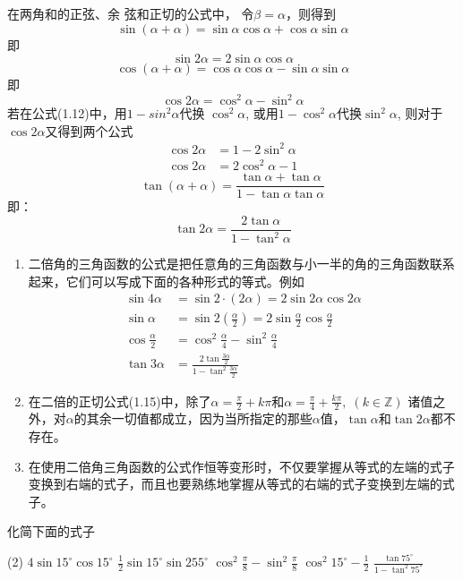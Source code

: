 在两角和的正弦、余
弦和正切的公式中，
令$\beta=\alpha$，则得到
\[\sin(\alpha+\alpha)=\sin\alpha\cos\alpha+\cos\alpha\sin\alpha\]
即
\begin{equation}
    \sin2\alpha=2\sin\alpha\cos\alpha
\end{equation}
\[\cos(\alpha+\alpha)=\cos\alpha\cos\alpha-\sin\alpha\sin\alpha\]
即
\begin{equation}
    \cos2\alpha=\cos^2\alpha-\sin^2\alpha
\end{equation}
若在公式(1.12)中，用$1-sin^2\alpha$代换 $\cos^2\alpha$, 或用$1-\cos^2\alpha$代换$\sin^2\alpha$, 则对于$\cos2\alpha$又得到两个公式
\begin{align}
    \cos2\alpha&=1-2\sin^2\alpha\\
    \cos2\alpha&=2\cos^2\alpha-1 
\end{align}
\[\tan (\alpha+\alpha)=\frac{\tan\alpha+\tan\alpha}{1-\tan\alpha\tan\alpha}\]
即：
\begin{equation}
    \tan2\alpha=\frac{2\tan\alpha}{1-\tan^2\alpha}
\end{equation}

\begin{rmk}
\begin{enumerate}
    \item 二倍角的三角函数的公式是把任意角的三角函数与小一半的角的三角函数联系起来，它们可以写成下面的各种形式的等式。例如
\[\begin{split}
    \sin4\alpha&=\sin2\cdot (2\alpha) =2\sin2\alpha\cos2\alpha\\
    \sin\alpha&=\sin2\left(\frac{\alpha}{2}\right)=2\sin\frac{\alpha}{2}\cos \frac{\alpha}{2}\\
    \cos\frac{\alpha}{2}&=\cos^2\frac{\alpha}{4}-\sin^2\frac{\alpha}{4}\\
    \tan3\alpha&=\frac{2\tan\frac{3\alpha}{2}}{1-\tan^2\frac{3\alpha}{2}}
\end{split}\]

\item 在二倍的正切公式(1.15)中，除了$\alpha=\frac{\pi}{2}+k\pi$和$\alpha=\frac{\pi}{4}+\frac{k\pi}{2},\; (k\in\mathbb{Z})$
诸值之外，对$\alpha$的其余一切值都成立，因为当所指定的那些$\alpha$值，$\tan\alpha$和$\tan2\alpha$都不存在。
\item 在使用二倍角三角函数的公式作恒等变形时，不仅要掌握从等式的左端的式子变换到右端的式子，而且也要熟练地掌握从等式的右端的式子变换到左端的式子。
\end{enumerate}
\end{rmk}

\begin{example}
    化简下面的式子
\begin{tasks}(2)
    \task $4\sin 15^{\circ}\cos 15^{\circ}$
    \task $\frac{1}{2}\sin 15^{\circ}\sin 255^{\circ}$
    \task $\cos^2\frac{\pi}{8}-\sin^2\frac{\pi}{8}$
    \task $\cos^2 15^{\circ}-\frac{1}{2}$
    \task $\frac{\tan 75^{\circ}}{1-\tan^2 75^{\circ}}$
\end{tasks}
\end{example}

